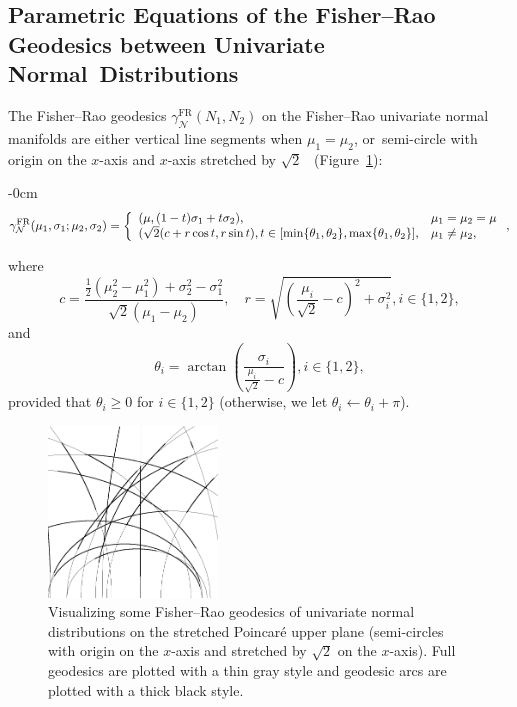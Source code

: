 \documentclass[entropy,article,accept,oneauthor,pdftex,entropy]{Definitions/mdpi}
\def\calN{\mathcal{N}}
\begin{document}
\subsection{Parametric Equations of the Fisher–Rao Geodesics between Univariate Normal~Distributions}\label{sec:geo1d}
The Fisher–Rao geodesics $\gamma_\calN^{\mathrm{FR}}(N_1,N_2)$ on the Fisher–Rao univariate normal manifolds are either vertical line segments when $\mu_1=\mu_2$, or~semi-circle with origin on the $x$-axis and $x$-axis stretched by $\sqrt{2}$~\cite{verdoolaege2015new} (Figure~\ref{fig:vizgeo1d}):


\begin{adjustwidth}{-\extralength}{0cm}
\centering %
$$
\gamma_\calN^{\mathrm{FR}}(\mu_1,\sigma_1;\mu_2,\sigma_2)=\left\{
\begin{array}{ll}
(\mu,(1-t)\sigma_1+t\sigma_2), & \mu_1=\mu_2=\mu\cr
(\sqrt{2}(c+r\cos t,r\sin t), t\in [\min\{\theta_1,\theta_2\},\max\{\theta_1,\theta_2\}], & \mu_1\not=\mu_2,
\end{array}
\right.,
$$
\end{adjustwidth}
where
$$
c=\frac{\frac{1}{2}(\mu_2^2-\mu_1^2)+\sigma_2^2-\sigma_1^2}{\sqrt{2}(\mu_1-\mu_2)},\quad
r=\sqrt{\left(\frac{\mu_i}{\sqrt{2}}-c\right)^2+\sigma_i^2}, i\in\{1,2\},
$$
and
$$
\theta_i=\arctan\left(\frac{\sigma_i}{\frac{\mu_i}{\sqrt{2}}-c}\right), i\in\{1,2\},
$$
provided that $\theta_i\geq 0$ for $i\in\{1,2\}$ (otherwise, we let $\theta_i\leftarrow\theta_i+\pi$).

\begin{figure}[H]

 
\includegraphics[width=0.4\textwidth]{FisherRaoGeodesics1D.png}  
%
\caption{Visualizing some Fisher–Rao geodesics of univariate normal distributions on the stretched Poincar\'e upper plane (semi-circles with origin on the $x$-axis and stretched by $\sqrt{2}$ on the $x$-axis). Full geodesics are plotted with a thin gray style and geodesic arcs are plotted with a thick black style.  
 \label{fig:vizgeo1d}}
\end{figure}
\end{document}
